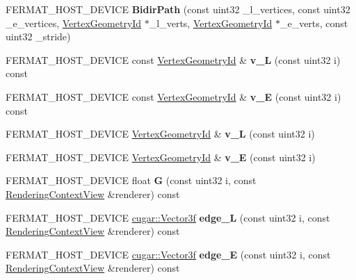 \begin{DoxyCompactItemize}
\item 
\mbox{\label{struct_bidir_path_a4643f77b09c2a1faeb185bc04b3613df}} 
F\+E\+R\+M\+A\+T\+\_\+\+H\+O\+S\+T\+\_\+\+D\+E\+V\+I\+CE {\bfseries Bidir\+Path} (const uint32 \+\_\+l\+\_\+vertices, const uint32 \+\_\+e\+\_\+vertices, \hyperlink{struct_vertex_geometry_id}{Vertex\+Geometry\+Id} $\ast$\+\_\+l\+\_\+verts, \hyperlink{struct_vertex_geometry_id}{Vertex\+Geometry\+Id} $\ast$\+\_\+e\+\_\+verts, const uint32 \+\_\+stride)
\item 
\mbox{\label{struct_bidir_path_abd3d2d7b295f0d269eb0d4845c7ee637}} 
F\+E\+R\+M\+A\+T\+\_\+\+H\+O\+S\+T\+\_\+\+D\+E\+V\+I\+CE const \hyperlink{struct_vertex_geometry_id}{Vertex\+Geometry\+Id} \& {\bfseries v\+\_\+L} (const uint32 i) const
\item 
\mbox{\label{struct_bidir_path_ab0bf814ab5bf4caa2b9ffcf6044fb23d}} 
F\+E\+R\+M\+A\+T\+\_\+\+H\+O\+S\+T\+\_\+\+D\+E\+V\+I\+CE const \hyperlink{struct_vertex_geometry_id}{Vertex\+Geometry\+Id} \& {\bfseries v\+\_\+E} (const uint32 i) const
\item 
\mbox{\label{struct_bidir_path_a5e725b0e53cb8eac269b11584d1f3ceb}} 
F\+E\+R\+M\+A\+T\+\_\+\+H\+O\+S\+T\+\_\+\+D\+E\+V\+I\+CE \hyperlink{struct_vertex_geometry_id}{Vertex\+Geometry\+Id} \& {\bfseries v\+\_\+L} (const uint32 i)
\item 
\mbox{\label{struct_bidir_path_aa28aac59260048299854b7e10a10e6d1}} 
F\+E\+R\+M\+A\+T\+\_\+\+H\+O\+S\+T\+\_\+\+D\+E\+V\+I\+CE \hyperlink{struct_vertex_geometry_id}{Vertex\+Geometry\+Id} \& {\bfseries v\+\_\+E} (const uint32 i)
\item 
\mbox{\label{struct_bidir_path_a3bfa276f8827d5fce6386376d609d7fc}} 
F\+E\+R\+M\+A\+T\+\_\+\+H\+O\+S\+T\+\_\+\+D\+E\+V\+I\+CE float {\bfseries G} (const uint32 i, const \hyperlink{struct_rendering_context_view}{Rendering\+Context\+View} \&renderer) const
\item 
\mbox{\label{struct_bidir_path_a5f6e5994ffcf0616ba6c64ffea4881df}} 
F\+E\+R\+M\+A\+T\+\_\+\+H\+O\+S\+T\+\_\+\+D\+E\+V\+I\+CE \hyperlink{structcugar_1_1_vector}{cugar\+::\+Vector3f} {\bfseries edge\+\_\+L} (const uint32 i, const \hyperlink{struct_rendering_context_view}{Rendering\+Context\+View} \&renderer) const
\item 
\mbox{\label{struct_bidir_path_ac29fb04ac1348b6bed02a506701ae6ed}} 
F\+E\+R\+M\+A\+T\+\_\+\+H\+O\+S\+T\+\_\+\+D\+E\+V\+I\+CE \hyperlink{structcugar_1_1_vector}{cugar\+::\+Vector3f} {\bfseries edge\+\_\+E} (const uint32 i, const \hyperlink{struct_rendering_context_view}{Rendering\+Context\+View} \&renderer) const
\end{DoxyCompactItemize}

